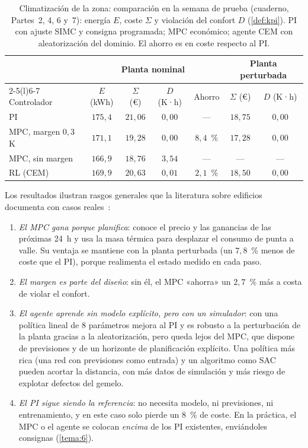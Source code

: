 \begin{table}[htbp]
\centering\small
\begin{tabular}{@{}lcccccc@{}}
\toprule
& \multicolumn{4}{c}{Planta nominal} & \multicolumn{2}{c}{Planta perturbada} \\
\cmidrule(lr){2-5}\cmidrule(l){6-7}
Controlador & $E$ (kWh) & $\Sigma$ (€) & $D$ (K·h) & Ahorro & $\Sigma$ (€) & $D$ (K·h) \\
\midrule
PI & $175{,}4$ & $21{,}06$ & $0{,}00$ & --- & $18{,}75$ & $0{,}00$ \\
MPC, margen $0{,}3$ K & $171{,}1$ & $19{,}28$ & $0{,}00$ & $8{,}4$~\% & $17{,}28$ & $0{,}00$ \\
MPC, sin margen & $166{,}9$ & $18{,}76$ & $3{,}54$ & --- & --- & --- \\
RL (CEM) & $169{,}9$ & $20{,}63$ & $0{,}01$ & $2{,}1$~\% & $18{,}50$ & $0{,}00$ \\
\bottomrule
\end{tabular}
\caption{Climatización de la zona: comparación en la semana de prueba (cuaderno, Partes~2, 4, 6 y~7): energía $E$, coste $\Sigma$ y violación del confort $D$ (\cref{def:kpi}). PI con ajuste SIMC y consigna programada; MPC económico; agente CEM con aleatorización del dominio. El ahorro es en coste respecto al PI.}
\label{tab:hvac}
\end{table}

Los resultados ilustran rasgos generales que la literatura sobre edificios documenta con casos reales~\cite{drgona,wanghong}:
\begin{enumerate}
  \item \emph{El MPC gana porque planifica}: conoce el precio y las ganancias de las próximas 24~h y usa la masa térmica para desplazar el consumo de punta a valle. Su ventaja se mantiene con la planta perturbada (un $7{,}8$~\% menos de coste que el PI), porque realimenta el estado medido en cada paso.
  \item \emph{El margen es parte del diseño}: sin él, el MPC «ahorra» un $2{,}7$~\% más a costa de violar el confort.
  \item \emph{El agente aprende sin modelo explícito, pero con un simulador}: con una política lineal de 8 parámetros mejora al PI y es robusto a la perturbación de la planta gracias a la aleatorización, pero queda lejos del MPC, que dispone de previsiones y de un horizonte de planificación explícito. Una política más rica (una red con previsiones como entrada) y un algoritmo como SAC pueden acortar la distancia, con más datos de simulación y más riesgo de explotar defectos del gemelo.
  \item \emph{El PI sigue siendo la referencia}: no necesita modelo, ni previsiones, ni entrenamiento, y en este caso solo pierde un $8$~\% de coste. En la práctica, el MPC o el agente se colocan \emph{encima} de los PI existentes, enviándoles consignas (\cref{tema:6}).
\end{enumerate}

